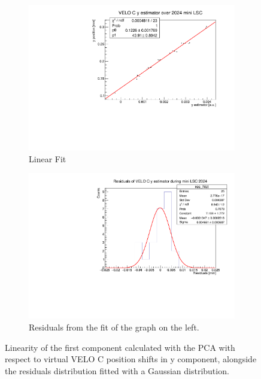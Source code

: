 \begin{figure}
    \centering
    \begin{subfigure}{0.48\textwidth}
    \includegraphics[width=\linewidth]{figures/y_fit_VELO_C_data.pdf}
    \caption{Linear Fit}\label{fig:y_veloC_fit_data}
    \end{subfigure}
    \begin{subfigure}{0.48\textwidth}
    \includegraphics[width=\linewidth]{figures/y_res_VELO_C_data.pdf}
    \caption{Residuals from the fit of the graph on the left. }\label{fig:y_veloC_res_data}
    \end{subfigure}
    \caption{Linearity of the first component calculated with the PCA with respect to  virtual VELO C position shifts in y component, alongside the residuals distribution fitted with a Gaussian distribution.}
    \label{fig:y_veloC_data}
\end{figure}

